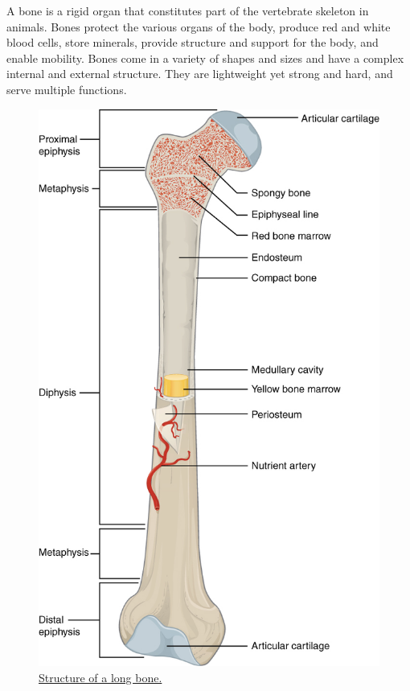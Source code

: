 A bone is a rigid organ that constitutes part of the vertebrate skeleton in animals. Bones protect the various organs of the body, produce red and white blood cells, store minerals, provide structure and support for the body, and enable mobility. Bones come in a variety of shapes and sizes and have a complex internal and external structure. They are lightweight yet strong and hard, and serve multiple functions.



\begin{figure}

{\centering \includegraphics[width=0.7\linewidth]{./figures/locomotion/603_Anatomy_of_Long_Bone} 

}

\caption{\href{https://commons.wikimedia.org/wiki/File:603_Anatomy_of_Long_Bone.jpg}{Structure of a long bone.}}\label{fig:longbone}
\end{figure}



